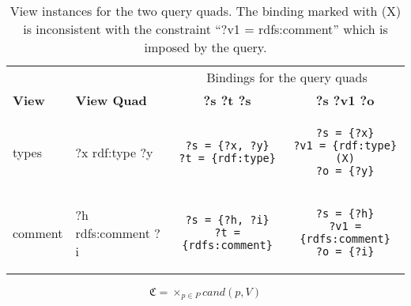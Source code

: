 \documentclass[a4paper,twoside,bibtotoc,abstracton,12pt,BCOR=15mm]{scrreprt}
\begin{document}
\begin{table}[!h]
\centering
\begin{tabular}{|ll|cc|}
\toprule
& & \multicolumn{2}{|c|}{Bindings for the query quads} \\
\textbf{View} & \textbf{View Quad} & \textbf{?s ?t ?s} & \textbf{?s ?v1 ?o}  \\
\hline
types
&
?x rdf:type ?y
&
\begin{minipage}{3cm}
\begin{scriptsize}
\begin{verbatim}
?s = {?x, ?y}
?t = {rdf:type}
\end{verbatim}
\end{scriptsize}
\end{minipage}
& 
\begin{minipage}{3cm}
\begin{scriptsize}
\begin{verbatim}
?s = {?x}
?v1 = {rdf:type} (X)
?o = {?y}
\end{verbatim}
\end{scriptsize}
\end{minipage}
\\
\hline
comment
&
?h rdfs:comment ?i
&
\begin{minipage}{3cm}
\begin{scriptsize}
\begin{verbatim}
?s = {?h, ?i}
?t = {rdfs:comment}
\end{verbatim}
\end{scriptsize}
\end{minipage}
&
\begin{minipage}{3cm}
\begin{scriptsize}
\begin{verbatim}
?s = {?h}
?v1 = {rdfs:comment}
?o = {?i}
\end{verbatim}
\end{scriptsize}
\end{minipage}
\\
\bottomrule
\end{tabular}
\caption{View instances for the two query quads. The binding marked with (X) is inconsistent with the constraint ``?v1 = rdfs:comment'' which is imposed by the query.}
\label{tab:bindings}
\end{table}

\begin{equation}\label{eq:view-instance-join}
\mathfrak{C} = \times_{p \in P} cand(p, V)
\end{equation}
\end{document}
